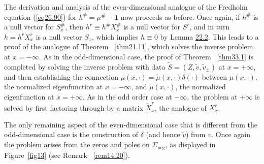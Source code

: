 \documentclass{surv-l}
\theoremstyle{plain}
\theoremstyle{definition}
\numberwithin{equation}{chapter}
\begin{document}
The derivation and analysis of the even-dimensional analogue of the Fredholm equation (\ref{eq26.90}) for $h^{\neq}=\mu^{\#}-\mathbf{1}$ now proceeds as before. Once again, if $ h^{\#}$ is a null vector for $ S_{x}^\#$, then $h^{r}\equiv h^{\#}X_{x}^{\#}$ is a null vector for $S^{r}$, and in turn $h=h^{r}X_{x}^{r}$ is a null vector $S_{x}$, which implies $h\equiv 0$ by Lemma \hyperref[lem22.2]{22.2}. This leads to a proof of the analogue of Theorem ~\ref{thm21.11}, which solves the inverse problem at $ x=-\infty$. As in the odd-dimensional case, the proof of Theorem ~\ref{thm33.1} is completed by solving the inverse problem with data $\tilde{S}=(Z,\tilde{v},\tilde{v}_{\pm})$ at $ x=+\infty$, and then establishing the connection $\mu(x, \cdot)=\tilde{\mu}(x, \cdot)\delta(\cdot)$ between $\mu(x, \cdot)$, the normalized eigenfunction at $x=-\infty$, and $\tilde{\mu}(x, \cdot)$, the normalized eigenfunction at $ x=+\infty$. As in the odd order case at $-\infty$, the problem at $+\infty$ is solved by first factoring through by a matrix $\tilde{X}_{x}^{r}$, the analogue of $X_{x}^{r}$.

The only remaining aspect of the even-dimensional case that is different from the odd-dimensional case is the construction of $\delta$ (and hence $\tilde{v}$) from $v$. Once again the problem arises from the zeros and poles on $\Sigma_{\mathrm{neg}}$, as displayed in Figure~\ref{fig13} (see Remark ~\ref{rem14.20}).
\end{document}
